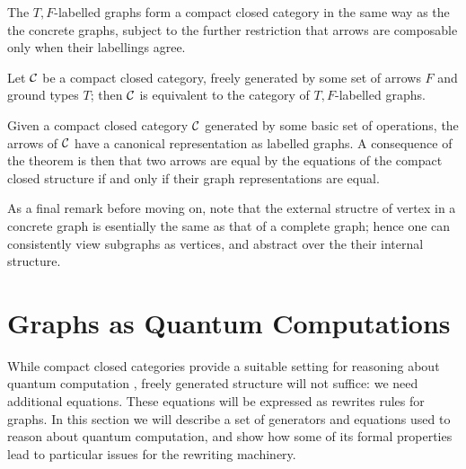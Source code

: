 \documentclass[runningheads]{llncs}
\newcommand{\catC}{\ensuremath{{\cal C}}\xspace}
\begin{document}
The $T,F$-labelled graphs form a compact closed category in the same
way as the the concrete graphs, subject to the further restriction
that arrows are composable only when their labellings agree.  

\begin{theorem}
  Let \catC be a compact closed category, freely generated by some set
  of arrows $F$ and ground types $T$;  then \catC is equivalent to the
  category  of $T,F$-labelled graphs.
\end{theorem}

Given a compact closed  category  \catC generated by some basic set of
operations,  the arrows of \catC have a canonical representation as
labelled graphs.  A consequence of the theorem is then that two arrows
are equal by the equations of the compact closed  structure if and
only if their graph representations are equal.

As a final remark before moving on, note that the external structre of vertex
in a concrete graph is esentially the same as that of a complete
graph;  hence one can consistently view subgraphs as vertices, and
abstract over the their internal structure.

\section{Graphs as Quantum Computations}
\label{sec:quotients-rewriting}

While compact closed categories provide a suitable setting for
reasoning about quantum computation \cite{AbrCoe:CatSemQuant:2004},
freely generated structure will not suffice:  we need additional
equations.  These equations will be expressed as rewrites rules for
graphs.  In this section we will describe a set of generators and equations
used to reason about quantum computation, and show how some of its formal
properties lead to particular issues for the rewriting machinery.
\end{document}
